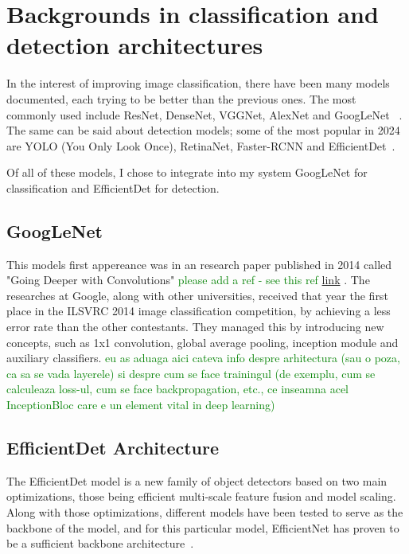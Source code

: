 \chapter{Backgrounds in classification and detection architectures}
\label{chap:ch3}

In the interest of improving image classification, there have been many models documented, each trying to be better than the previous ones. The most commonly used include ResNet, DenseNet, VGGNet, AlexNet and GoogLeNet ~\cite{link8}. The same can be said about detection models; some of the most popular in 2024 are YOLO (You Only Look Once), RetinaNet, Faster-RCNN and EfficientDet~\cite{carte11}.

Of all of these models, I chose to integrate into my system GoogLeNet for classification and EfficientDet for detection.

\section{GoogLeNet}
This models first appereance was in an research paper published in 2014 called "Going Deeper with Convolutions"
\textcolor{green}{please add a ref - see this ref \href{https://arxiv.org/abs/1409.4842}{link}}
. The researches at Google, along with other universities, received that year the first place in the  ILSVRC 2014 image classification competition, by achieving a less error rate than the other contestants. They managed this by introducing new concepts, such as 1x1 convolution, global average pooling, inception module and auxiliary classifiers.
\textcolor{green}{eu as aduaga aici cateva info despre arhitectura (sau o poza, ca sa se vada layerele) si despre cum se face trainingul (de exemplu, cum se calculeaza loss-ul, cum se face backpropagation, etc., ce inseamna acel InceptionBloc care e un element vital in deep learning)}

\section{EfficientDet Architecture}

The EfficientDet model is a new family of object detectors based on two main optimizations, those being efficient multi-scale feature fusion and model scaling. Along with those optimizations, different models have been tested to serve as the backbone of the model, and for this particular model, EfficientNet has proven to be a sufficient backbone architecture~\cite{carte8}.

